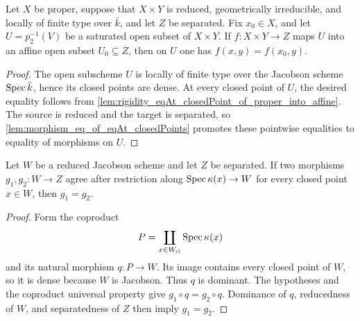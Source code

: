 \begin{lemma}
  \label{lem:rigidity_eqOn_saturated_open_to_affine}
  \leanok
  Let \(X\) be proper, suppose that \(X\times Y\) is reduced, geometrically
  irreducible, and locally of finite type over \(\bar k\), and let \(Z\) be separated.
  Fix \(x_0\in X\), and let \(U=p_2^{-1}(V)\) be a saturated open subset of
  \(X\times Y\).  If \(f\colon X\times Y\to Z\) maps \(U\) into an affine open
  subset \(U_0\subseteq Z\), then on \(U\) one has \(f(x,y)=f(x_0,y)\).
\end{lemma}
\begin{proof}
  \leanok
  The open subscheme \(U\) is locally of finite type over the Jacobson scheme
  \(\operatorname{Spec}\bar k\), hence its closed points are dense.  At every closed point of
  \(U\), the desired equality follows from
  \cref{lem:rigidity_eqAt_closedPoint_of_proper_into_affine}.  The source is reduced
  and the target is separated, so
  \cref{lem:morphism_eq_of_eqAt_closedPoints} promotes these pointwise equalities to
  equality of morphisms on \(U\).
\end{proof}

\begin{lemma}
  \label{lem:morphism_eq_of_eqAt_closedPoints}
  \leanok
  Let \(W\) be a reduced Jacobson scheme and let \(Z\) be separated.  If two
  morphisms \(g_1,g_2\colon W\to Z\) agree after restriction along
  \(\operatorname{Spec}\kappa(x)\to W\) for every closed point \(x\in W\), then \(g_1=g_2\).
\end{lemma}
\begin{proof}
  \leanok
  Form the coproduct
  \[
    P=\coprod_{x\in W_{\mathrm{cl}}}\operatorname{Spec}\kappa(x)
  \]
  and its natural morphism \(q\colon P\to W\).  Its image contains every closed
  point of \(W\), so it is dense because \(W\) is Jacobson.  Thus \(q\) is dominant.
  The hypotheses and the coproduct universal property give
  \(g_1\circ q=g_2\circ q\).  Dominance of \(q\), reducedness of \(W\), and
  separatedness of \(Z\) then imply \(g_1=g_2\).
\end{proof}

